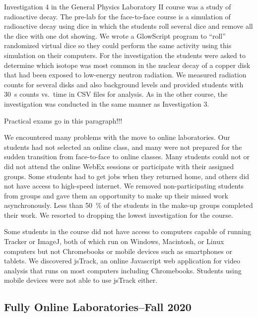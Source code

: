 \documentclass[aip, preprint, numerical]{revtex4-2}
\begin{document}
Investigation 4 in the General Physics Laboratory II course was a study of radioactive decay. The pre-lab for the face-to-face course is a simulation of radioactive decay using dice in which the students roll several dice and remove all the dice with one dot showing. We wrote a GlowScript\citep{glowscript} program to ``roll'' randomized virtual dice so they could perform the same activity using this simulation on their computers. For the investigation the students were asked to determine which isotope was most common in the nuclear decay of a copper disk that had been exposed to low-energy neutron radiation. We measured radiation counts for several disks and also background levels and provided students with \SI{30}{s} counts vs.\ time in CSV files for analysis. As in the other course, the investigation was conducted in the same manner as Investigation 3.


Practical exams go in this paragraph!!!

We encountered many problems with the move to online laboratories. Our students had not selected an online class, and many were not prepared for the sudden transition from face-to-face to online classes. Many students could not or did not attend the online WebEx sessions or participate with their assigned groups. Some students had to get jobs when they returned home, and others did not have access to high-speed internet. We removed non-participating students from groups and gave them an opportunity to make up their missed work asynchronously. Less than \SI{50}{\percent} of the students in the make-up groups completed their work. We resorted to dropping the lowest investigation for the course.

Some students in the course did not have access to computers capable of running Tracker or ImageJ, both of which run on Windows, Macintosh, or Linux computers but not Chromebooks or mobile devices such as smartphones or tablets. We discovered jsTrack\citep{jstrack}, an online Javascript web application for video analysis that runs on most computers including Chromebooks. Students using mobile devices were not able to use jsTrack either.

\subsection{Fully Online Laboratories--Fall 2020}
\end{document}
